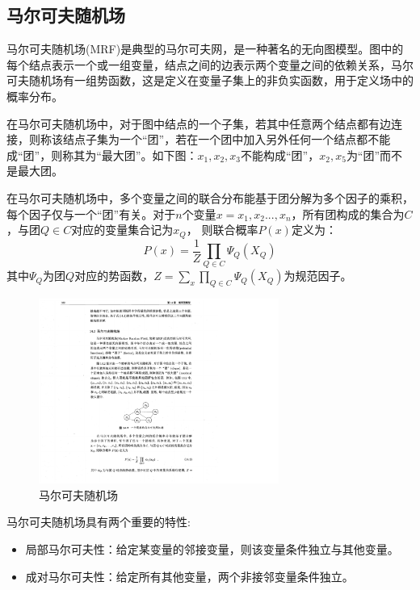 \subsection{马尔可夫随机场}
马尔可夫随机场(MRF)是典型的马尔可夫网，是一种著名的无向图模型。图中的每个结点表示一个或一组变量，结点之间的边表示两个变量之间的依赖关系，马尔可夫随机场有一组势函数，这是定义在变量子集上的非负实函数，用于定义场中的概率分布。
\par 在马尔可夫随机场中，对于图中结点的一个子集，若其中任意两个结点都有边连接，则称该结点子集为一个“团”，若在一个团中加入另外任何一个结点都不能成“团”，则称其为“最大团”。如下图：${x_1, x_2, x_3}$不能构成“团”，${x_2, x_5}$为“团”而不是最大团。
\par 在马尔可夫随机场中，多个变量之间的联合分布能基于团分解为多个因子的乘积，每个因子仅与一个“团”有关。对于$n$个变量$x = {x_1, x_2...,x_n}$，所有团构成的集合为$C$，与团$Q\in C$对应的变量集合记为$x_Q$， 则联合概率$P(x)$定义为：
$$P(x)=\frac{1}{Z} \prod_{Q\in C} \Psi_{Q}(X_{Q})$$
其中$ \Psi_{Q}$为团$Q$对应的势函数，$Z = \sum_x \prod_{Q\in C} \Psi_{Q}(X_{Q})$为规范因子。
\begin{figure}[htbp]
\begin{center}
\includegraphics[width=0.7\textwidth]{figures//4.pdf}
\caption{马尔可夫随机场}
\label{default}
\end{center}
\end{figure}
\par 马尔可夫随机场具有两个重要的特性:
\begin{itemize}
\item 局部马尔可夫性：给定某变量的邻接变量，则该变量条件独立与其他变量。
\item 成对马尔可夫性：给定所有其他变量，两个非接邻变量条件独立。
\end{itemize}
